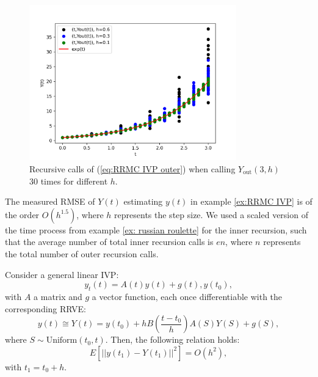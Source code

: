 \documentclass[a4paper,12pt]{article}
\begin{document}
\begin{pythonn} \label{py:RRMC IVP}

    \begin{figure}[h!]
        \centering
        \includegraphics[width=0.8\textwidth]{plots/RRMC IVP.png}
        \caption{Recursive calls of (\ref{eq:RRMC IVP outer})
            when calling $Y_{\text{out}}(3,h)$ $30$ times for different $h$.  }
        \label{fig:RRMC IVP}
    \end{figure}
\end{pythonn}

The measured RMSE of $Y(t)$ estimating $y(t)$ in example
\ref{ex:RRMC IVP} is of the order $O\left(h^{1.5} \right)$, where $h$ represents
the step size.
We used a scaled version of the time process from example \ref{ex: russian roulette}
for the inner recursion, such that the average number of total inner recursion calls
is $e n$, where $n$ represents the total number of outer recursion calls.

\begin{conjecture}
    Consider a general linear IVP:
    \begin{equation}
        y_{t}(t)= A(t)y(t)+g(t), y(t_{0}),
    \end{equation}
    with $A$ a matrix and $g$ a vector function, each
    once differentiable with the corresponding RRVE:
    \begin{equation}
        y(t) \cong Y(t) = y(t_{0}) + h B \left( \frac{t-t_{0}}{h}\right)
        A(S) Y(S) + g(S),
    \end{equation}
    where $S \sim \text{Uniform}(t_{0},t)$. Then, the following relation holds:
    \begin{equation}
        E[||y(t_{1})-Y(t_{1})||^{2}] = O(h^{2}),
    \end{equation}
    with $t_{1} = t_{0} + h$.
\end{conjecture}
\end{document}
